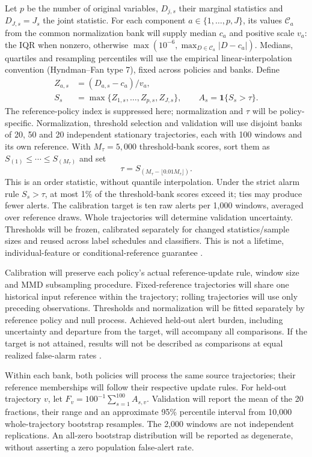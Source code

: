 \documentclass[11pt,a4paper]{article}
\newcommand{\ind}{\mathbf{1}}
\begin{document}
Let $p$ be the number of original variables, $D_{j,s}$ their marginal
statistics and $D_{J,s}=J_s$ the joint statistic. For each component
$a\in\{1,\ldots,p,J\}$, its values $\mathcal C_a$ from the common
normalization bank will supply
median $c_a$ and positive scale $v_a$: the IQR when nonzero, otherwise
$\max(10^{-6},\max_{D\in\mathcal C_a}|D-c_a|)$. Medians, quartiles and
resampling percentiles will
use the empirical linear-interpolation convention (Hyndman--Fan type 7), fixed
across policies and banks. Define
\begin{align}
Z_{a,s}&=(D_{a,s}-c_a)/v_a,\\
S_s&=\max\{Z_{1,s},\ldots,Z_{p,s},Z_{J,s}\},\qquad
A_s=\ind\{S_s>\tau\}.
\end{align}
The reference-policy index is suppressed here; normalization and $\tau$ will be
policy-specific.
Normalization, threshold selection and validation will use disjoint
banks of 20, 50 and 20 independent stationary trajectories, each with 100
windows and its own reference. With $M_\tau=5{,}000$ threshold-bank scores,
sort them as $S_{(1)}\leq\cdots\leq S_{(M_\tau)}$ and set
\begin{equation}
\tau=S_{(M_\tau-\lfloor0.01M_\tau\rfloor)}.
\end{equation}
This is an order statistic, without quantile interpolation. Under the strict
alarm rule $S_s>\tau$, at most 1\% of the threshold-bank scores exceed it;
ties may produce fewer alerts. The calibration target is ten raw alerts per
1,000 windows, averaged over reference draws. Whole trajectories will determine validation
uncertainty. Thresholds will be frozen, calibrated separately for changed
statistics/sample sizes and reused across label schedules and classifiers.
This is not a lifetime, individual-feature or conditional-reference guarantee
\cite{cerqueira,lukats}.

Calibration will preserve each policy's actual reference-update rule, window
size and MMD subsampling procedure. Fixed-reference trajectories will share one
historical input reference within the trajectory; rolling trajectories will
use only preceding observations. Thresholds and normalization will be fitted
separately by reference policy and null process. Achieved held-out alert burden,
including uncertainty and departure from the target, will accompany all
comparisons. If the target is not attained, results will not be described as
comparisons at equal realized false-alarm rates \cite{cerqueira,lukats}.

Within each bank, both policies will process the same source trajectories;
their reference memberships will follow their respective update rules. For
held-out trajectory $v$, let $F_v=100^{-1}\sum_{s=1}^{100}A_{s,v}$.
Validation will report the mean of the 20 fractions, their range and an
approximate 95\% percentile interval from 10,000 whole-trajectory bootstrap
resamples. The 2,000 windows are not independent replications. An all-zero
bootstrap distribution will be reported as degenerate, without asserting a
zero population false-alert rate.
\end{document}

